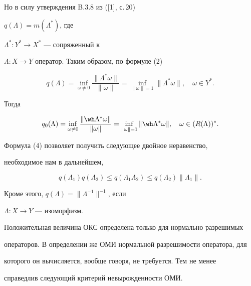 Но в силу утверждения B.3.8 из ([1], с.\,20) 


$q(\Lambda)=m(\Lambda^*)$, где 


$\Lambda^*:Y^*\to X^*$ --- сопряженный к 


$\Lambda:X\to Y$ оператор. Таким образом, по формуле (2) 


\begin{equation} 


q(\Lambda)=\inf_{\omega\ne 0}\frac{\|\Lambda^*\omega\|}{\|\omega\|} 


=\inf_{\|\omega\|=1}\|\Lambda^*\omega\|,\quad 


\omega\in Y^*. 


\end{equation} 


Тогда 


\begin{equation} 


q_0(\Lambda)=\inf_{\omega\ne 0}\frac{\|\wh\Lambda^*\omega\|} 


{\|\omega\|}=\inf_{\|\omega\|=1}\|\wh\Lambda^*\omega\|,\quad 


\omega\in (R(\Lambda))^*. 


\end{equation} 


 


Формула (4) позволяет получить следующее двойное неравенство, 


необходимое нам в дальнейшем,


\begin{equation} 


q(\Lambda_1)q(\Lambda_2)\le q(\Lambda_1\Lambda_2)\le 


q(\Lambda_2)\|\Lambda_1\|. 


\end{equation} 


Кроме этого, $q(\Lambda)=\|\Lambda^{-1}\|^{-1}$, если 


$\Lambda:X\to Y$ --- изоморфизм. 


 


Положительная величина ОКС определена только для нормально разрешимых


операторов. В определении же ОМИ нормальной разрешимости оператора, для


которого он вычисляется, вообще говоря, не требуется. Тем не менее


справедлив следующий критерий невырожденности ОМИ. 


